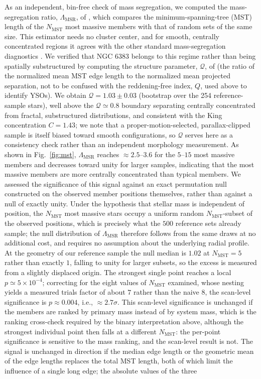 \documentclass{aa}
\begin{document}
As an independent, bin-free check of mass segregation, we computed the mass-segregation ratio, $\Lambda_{\mathrm{MSR}}$, of \citet{2009MNRAS.395.1449A}, which compares the minimum-spanning-tree (MST) length of the $N_{\mathrm{MST}}$ most massive members with that of random sets of the same size. This estimator needs no cluster center, and for smooth, centrally concentrated regions it agrees with the other standard mass-segregation diagnostics \citep{2015MNRAS.449.3381P}. We verified that NGC 6383 belongs to this regime rather than being spatially substructured by computing the structure parameter, $\mathcal{Q}$, of \citet{2004MNRAS.348..589C} (the ratio of the normalized mean MST edge length to the normalized mean projected separation, not to be confused with the reddening-free index, $Q$, used above to identify YSOs). We obtain $\mathcal{Q}=1.03\pm0.03$ (bootstrap over the 254 reference-sample stars), well above the $\mathcal{Q}\simeq0.8$ boundary separating centrally concentrated from fractal, substructured distributions, and consistent with the King concentration $C=1.43$; we note that a proper-motion-selected, parallax-clipped sample is itself biased toward smooth configurations, so $\mathcal{Q}$ serves here as a consistency check rather than an independent morphology measurement. As shown in Fig.~\ref{fig:mst}, $\Lambda_{\mathrm{MSR}}$ reaches $\approx2.5$--$3.6$ for the $5$--$15$ most massive members and decreases toward unity for larger samples, indicating that the most massive members are more centrally concentrated than typical members. We assessed the significance of this signal against an exact permutation null constructed on the observed member positions themselves, rather than against a null of exactly unity. Under the hypothesis that stellar mass is independent of position, the $N_{\mathrm{MST}}$ most massive stars occupy a uniform random $N_{\mathrm{MST}}$-subset of the observed positions, which is precisely what the $500$ reference sets already sample; the null distribution of $\Lambda_{\mathrm{MSR}}$ therefore follows from the same draws at no additional cost, and requires no assumption about the underlying radial profile. At the geometry of our reference sample the null median is $1.02$ at $N_{\mathrm{MST}}=5$ rather than exactly $1$, falling to unity for larger subsets, so the excess is measured from a slightly displaced origin. The strongest single point reaches a local $p\simeq5\times10^{-4}$; correcting for the eight values of $N_{\mathrm{MST}}$ examined, whose nesting yields a measured trials factor of about $7$ rather than the naive $8$, the scan-level significance is $p\approx0.004$, i.e., $\approx2.7\sigma$. This scan-level significance is unchanged if the members are ranked by primary mass instead of by system mass, which is the ranking cross-check required by the binary interpretation above, although the strongest individual point then falls at a different $N_{\mathrm{MST}}$: the per-point significance is sensitive to the mass ranking, and the scan-level result is not. The signal is unchanged in direction if the median edge length \citep{2011MNRAS.416..541M} or the geometric mean of the edge lengths \citep{2011A&A...532A.119O} replaces the total MST length, both of which limit the influence of a single long edge; the absolute values of the three 
\end{document}
